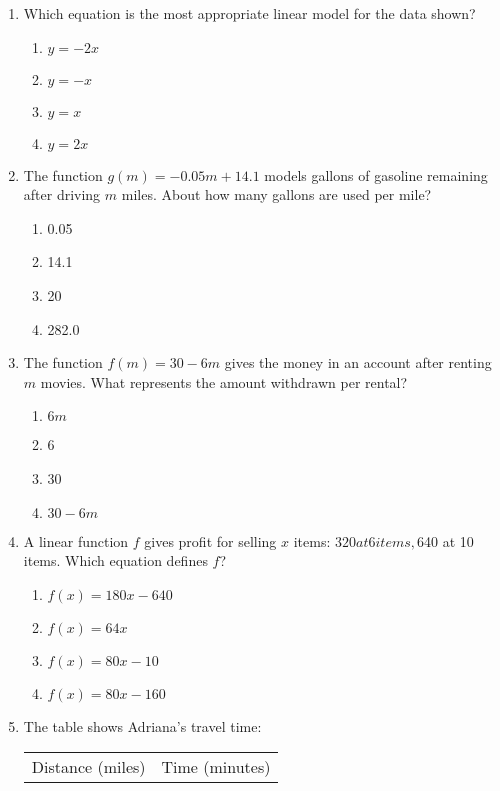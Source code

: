\documentclass[12pt]{exam}
\begin{document}
\begin{enumerate}
    \item Which equation is the most appropriate linear model for the data shown?
    \begin{enumerate}[label=\Alph*)]
        \item $y = -2x$
        \item $y = -x$
        \item $y = x$
        \item $y = 2x$
    \end{enumerate}
    \item The function $g(m) = -0.05m + 14.1$ models gallons of gasoline remaining after driving $m$ miles. About how many gallons are used per mile?
    \begin{enumerate}[label=\Alph*)]
        \item 0.05
        \item 14.1
        \item 20
        \item 282.0
    \end{enumerate}
    \item The function $f(m) = 30 - 6m$ gives the money in an account after renting $m$ movies. What represents the amount withdrawn per rental?
    \begin{enumerate}[label=\Alph*)]
        \item $6m$
        \item 6
        \item 30
        \item $30 - 6m$
    \end{enumerate}
    \item A linear function $f$ gives profit for selling $x$ items: $320 at 6 items, $640 at 10 items. Which equation defines $f$?
    \begin{enumerate}[label=\Alph*)]
        \item $f(x) = 180x - 640$
        \item $f(x) = 64x$
        \item $f(x) = 80x - 10$
        \item $f(x) = 80x - 160$
    \end{enumerate}
    \item The table shows Adriana's travel time:
    \begin{center}
        \begin{tabular}{|c|c|}
            \hline
            Distance (miles) & Time (minutes) \\

\end{tabular}
\end{center}
\end{enumerate}
\end{document}
